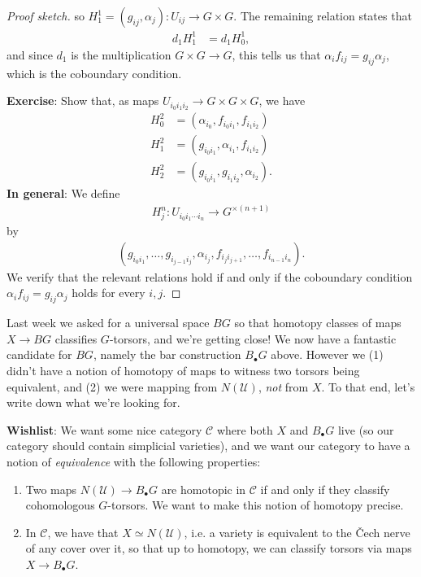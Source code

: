 \documentclass[11pt,openany]{book}
\begin{document}
\begin{proof}[Proof sketch]
so $H^1_1 = (g_{ij},\alpha_j) \colon U_{ij} \to G \times G$. The remaining relation states that
\begin{align*}
    d_1 H_1^1 &= d_1 H_0^1,
\end{align*}
and since $d_1$ is the multiplication $G \times G \to G$, this tells us that $\alpha_i f_{ij} = g_{ij}\alpha_j$, which is the coboundary condition.

\textbf{Exercise}: Show that, as maps $U_{i_0 i_1 i_2} \to G \times G \times G$, we have
\begin{align*}
    H_0^2 &= \left( \alpha_{i_0}, f_{i_0 i_1}, f_{i_1 i_2} \right) \\
    H_1^2 &= \left( g_{i_0 i_1}, \alpha_{i_1}, f_{i_1 i_2} \right) \\
    H_2^2 &= \left( g_{i_0 i_1}, g_{i_1 i_2}, \alpha_{i_2} \right).
\end{align*}
%
\textbf{In general}: We define
\begin{align*}
    H^n_j \colon U_{i_0 i_1 \cdots i_n} \to G^{\times (n+1)}
\end{align*}
by
\begin{align*}
    \left(g_{i_0 i_1}, \ldots, g_{i_{j-1} i_j},\alpha_{i_j}, f_{i_j i_{j+1}}, \ldots, f_{i_{n-1} i_n} \right).
\end{align*}
We verify that the relevant relations hold if and only if the coboundary condition $\alpha_i f_{ij} = g_{ij} \alpha_j$ holds for every $i,j$.
%
\end{proof}

\begin{motivation} 
Last week we asked for a universal space $BG$ so that homotopy classes of maps $X \to BG$ classifies $G$-torsors, and we're getting close! We now have a fantastic candidate for $BG$, namely the bar construction $B_\bullet G$ above. However we (1) didn't have a notion of homotopy of maps to witness two torsors being equivalent, and (2) we were mapping from $N(\mathcal{U})$, \textit{not} from $X$. To that end, let's write down what we're looking for.
\end{motivation}

\textbf{Wishlist}: We want some nice category $\mathscr{C}$ where both $X$ and $B_\bullet G$ live (so our category should contain simplicial varieties), and we want our category to have a notion of \textit{equivalence} with the following properties:
\begin{enumerate}
    \item Two maps $N(\mathcal{U}) \to B_\bullet G$ are homotopic in $\mathscr{C}$ if and only if they classify cohomologous $G$-torsors. We want to make this notion of homotopy precise.
    \item In $\mathscr{C}$, we have that $X \simeq N(\mathcal{U})$, i.e. a variety is equivalent to the \v{C}ech nerve of any cover over it, so that up to homotopy, we can classify torsors via maps $X \to B_\bullet G$.
\end{enumerate}
\end{document}
